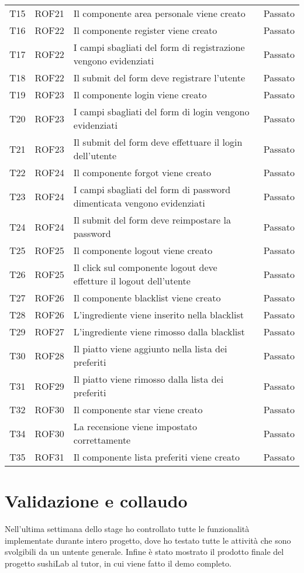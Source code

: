 \begin{center}
\begin{longtable}{ |p{1cm}|p{1.5cm}|p{9cm}|p{1.5cm}|  }
        T15&ROF21&Il componente area personale viene creato&Passato\\
        T16&ROF22&Il componente register viene creato&Passato\\
        T17&ROF22&I campi sbagliati del form di registrazione vengono evidenziati&Passato\\
        T18&ROF22&Il submit del form deve registrare l'utente&Passato\\
        T19&ROF23&Il componente login viene creato&Passato\\
        T20&ROF23&I campi sbagliati del form di login vengono evidenziati &Passato\\
        T21&ROF23&Il submit del form deve effettuare il login dell'utente &Passato\\
        T22&ROF24&Il componente forgot viene creato  &Passato\\
        T23&ROF24&I campi sbagliati del form di password dimenticata vengono evidenziati &Passato\\
        T24&ROF24&Il submit del form deve reimpostare la password&Passato\\
        T25&ROF25&Il componente logout viene creato&Passato\\
        T26&ROF25&Il click sul componente logout deve effetture il logout dell'utente&Passato\\
        T27&ROF26&Il componente blacklist viene creato&Passato\\
        T28&ROF26&L'ingrediente viene inserito nella blacklist&Passato\\
        T29&ROF27&L'ingrediente viene rimosso dalla blacklist&Passato\\
        T30&ROF28&Il piatto viene aggiunto nella lista dei preferiti&Passato\\
        T31&ROF29&Il piatto viene rimosso dalla lista dei preferiti&Passato\\
        T32&ROF30&Il componente star viene creato&Passato\\
        T34&ROF30&La recensione viene impostato correttamente&Passato\\
        T35&ROF31&Il componente lista preferiti viene creato&Passato\\
\hline
\end{longtable}
\end{center}
\section{Validazione e collaudo}
Nell'ultima settimana dello stage ho controllato tutte le funzionalità implementate durante intero progetto, dove ho testato tutte le attività che sono svolgibili da un untente generale. Infine è stato mostrato il prodotto finale del progetto sushiLab al tutor, in cui viene fatto il demo completo.
